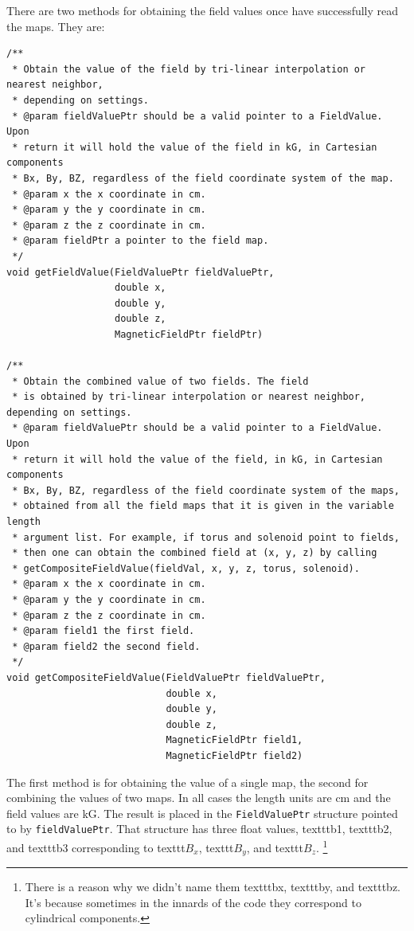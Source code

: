\documentclass{article}
\begin{document}
There are two methods for obtaining the field values once have successfully read the maps. They are:
\begin{verbatim}
/**
 * Obtain the value of the field by tri-linear interpolation or nearest neighbor,
 * depending on settings.
 * @param fieldValuePtr should be a valid pointer to a FieldValue. Upon
 * return it will hold the value of the field in kG, in Cartesian components
 * Bx, By, BZ, regardless of the field coordinate system of the map.
 * @param x the x coordinate in cm.
 * @param y the y coordinate in cm.
 * @param z the z coordinate in cm.
 * @param fieldPtr a pointer to the field map.
 */
void getFieldValue(FieldValuePtr fieldValuePtr,
                   double x,
                   double y,
                   double z,
                   MagneticFieldPtr fieldPtr)

/**
 * Obtain the combined value of two fields. The field
 * is obtained by tri-linear interpolation or nearest neighbor, depending on settings.
 * @param fieldValuePtr should be a valid pointer to a FieldValue. Upon
 * return it will hold the value of the field, in kG, in Cartesian components
 * Bx, By, BZ, regardless of the field coordinate system of the maps,
 * obtained from all the field maps that it is given in the variable length
 * argument list. For example, if torus and solenoid point to fields,
 * then one can obtain the combined field at (x, y, z) by calling
 * getCompositeFieldValue(fieldVal, x, y, z, torus, solenoid).
 * @param x the x coordinate in cm.
 * @param y the y coordinate in cm.
 * @param z the z coordinate in cm.
 * @param field1 the first field.
 * @param field2 the second field.
 */
void getCompositeFieldValue(FieldValuePtr fieldValuePtr,
                            double x,
                            double y,
                            double z,
                            MagneticFieldPtr field1,
                            MagneticFieldPtr field2) 

\end{verbatim}
The first method is for obtaining the value of a single map, the second for combining the values of two maps. In all cases the length units are cm and the field values are kG. The result is placed in the \texttt{FieldValuePtr} structure pointed to by \texttt{fieldValuePtr}. That structure has three float values, texttt{b1}, texttt{b2}, and texttt{b3} corresponding to texttt{$B_x$}, texttt{$B_y$}, and texttt{$B_z$}. \footnote{There is a reason why we didn't name them texttt{bx}, texttt{by}, and texttt{bz}. It's because sometimes in the innards of the code they correspond to cylindrical components.}
\end{document}
